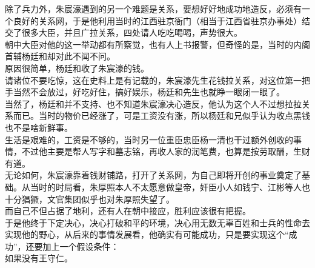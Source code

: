 \begin{multicols}{\theparacolNo}
除了兵力外，朱宸濠遇到的另一个难题是关系，要想好好地成功地造反，必须有一个良好的关系网，于是他利用当时的江西驻京衙门（相当于江西省驻京办事处）结交了很多大臣，并且广拉关系，四处请人吃吃喝喝，声势很大。\\

朝中大臣对他的这一举动都有所察觉，也有人上书报警，但奇怪的是，当时的内阁首辅杨廷和却对此不闻不问。\\

原因很简单，杨廷和收了朱宸濠的钱。\\

请诸位不要吃惊，这在史料上是有记载的，朱宸濠先生花钱拉关系，对这位第一把手当然不会放过，好吃好住，搞好娱乐，杨廷和先生也就睁一眼闭一眼了。\\

当然了，杨廷和并不支持、也不知道朱宸濠决心造反，他认为这个人不过想拉拉关系而已。当时的物价已经涨了，可是工资没有涨，所以杨廷和兄似乎认为收点黑钱也不是啥新鲜事。\\

生活是艰难的，工资是不够的，当时另一位重臣忠臣杨一清也干过额外创收的事情，不过他主要是帮人写字和墓志铭，再收人家的润笔费，也算是按劳取酬，生财有道。\\

无论如何，朱宸濠靠着钱财铺路，打开了关系网，为自己即将开创的事业奠定了基础。从当时的时局看，朱厚照本人不太愿意做皇帝，奸臣小人如钱宁、江彬等人也十分猖獗，文官集团似乎也对朱厚照失望了。\\

而自己不但占据了地利，还有人在朝中接应，胜利应该很有把握。\\

于是他终于下定决心，决心打破和平的环境，决心用无数无辜百姓和士兵的性命去实现他的野心，从后来的事情发展看，他确实有可能成功，只是要实现这个“成功”，还要加上一个假设条件：\\

如果没有王守仁。\\
\ifnum{}
	\end{multicols}
\fi
\newpage
